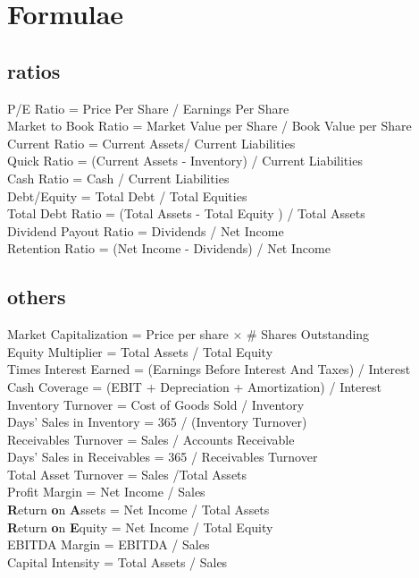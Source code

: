 \section{Formulae}
\subsection{ratios}
\begin{scriptsize}
P/E Ratio = Price Per Share / Earnings Per Share \\
Market to Book Ratio = Market Value per Share / Book Value per Share \\
Current Ratio = Current Assets/ Current Liabilities \\
Quick Ratio = (Current Assets - Inventory) / Current Liabilities \\
Cash Ratio = Cash / Current Liabilities \\
Debt/Equity = Total Debt / Total Equities \\
Total Debt Ratio = (Total Assets - Total Equity ) / Total Assets \\
Dividend Payout Ratio = Dividends / Net Income \\
Retention Ratio = (Net Income - Dividends) / Net Income \\
\end{scriptsize}
\subsection{others}
\begin{scriptsize}
Market Capitalization = Price per share $\times$ \# Shares Outstanding \\
Equity Multiplier = Total Assets / Total Equity \\
Times Interest Earned = (Earnings Before Interest And Taxes) / Interest \\
Cash Coverage = (EBIT + Depreciation + Amortization) / Interest \\
Inventory Turnover = Cost of Goods Sold / Inventory \\
Days' Sales in Inventory = 365 / (Inventory Turnover) \\
Receivables Turnover = Sales / Accounts Receivable \\
Days' Sales in Receivables = 365 / Receivables Turnover \\
Total Asset Turnover = Sales  /Total Assets  \\
Profit Margin = Net Income / Sales \\
\textbf{R}eturn \textbf{o}n \textbf{A}ssets = Net Income / Total Assets \\
\textbf{R}eturn \textbf{o}n \textbf{E}quity = Net Income / Total Equity \\
EBITDA Margin = EBITDA / Sales \\
Capital Intensity = Total Assets / Sales \\
\end{scriptsize}
